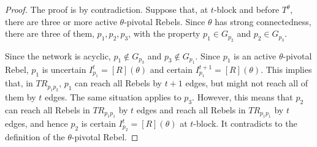 \documentclass[12pt,letter]{article}
\theoremstyle{definition}
\theoremstyle{remark}
\theoremstyle{claim}
\begin{document}
\begin{proof}
The proof is by contradiction. Suppose that, at $t$-block and before $T^{\theta}$, there are three or more active $\theta$-pivotal Rebels. Since $\theta$ has strong connectedness, there are three of them, $p_1,p_2,p_3$, with the property $p_1\in G_{p_2}$ and $p_2 \in G_{p_3}$. 

Since the network is acyclic, $p_1\notin G_{p_3}$ and $p_3\notin G_{p_1}$. Since $p_1$ is an active $\theta$-pivotal Rebel, $p_1$ is uncertain  $I^t_{p_1}= [R](\theta)$ and certain $I^{t+1}_{p_1}=[R](\theta)$. This implies that, in $TR_{p_1p_2}$, $p_1$ can reach all Rebels by $t+1$ edges, but might not reach all of them by $t$ edges. The same situation applies to $p_3$. However, this means that $p_2$ can reach all Rebels in $TR_{p_1p_1}$ by $t$ edges and reach all Rebels in $TR_{p_1p_1}$ by $t$ edges, and hence $p_2$ is certain $I^t_{p_2}=[R](\theta)$ at $t$-block. It contradicts to the definition of the $\theta$-pivotal Rebel.

\end{proof}
\end{document}
